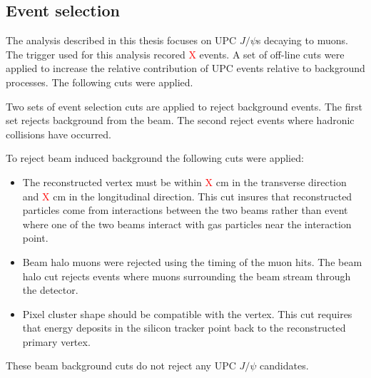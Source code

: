     \subsection{Event selection}
      The analysis described in this thesis focuses on UPC $J/\psi$s decaying to 
        muons. 
      The trigger used for this analysis recored \textcolor{red}{X} events.
      A set of off-line cuts were applied to increase the relative contribution 
        of UPC events relative to background processes. 
      The following cuts were applied. 
  
      Two sets of event selection cuts are applied to reject background events. 
      The first set rejects background from the beam.
      The second reject events where hadronic collisions have occurred.
      
      To reject beam induced background the following cuts were applied:
      \begin{itemize}
        \item The reconstructed vertex must be within \textcolor{red}{X} cm in 
          the transverse direction and \textcolor{red}{X} cm in the 
          longitudinal direction. This cut insures that reconstructed particles 
          come from interactions between the two beams rather than event where 
          one of the two beams interact with gas particles near the interaction 
          point. 
  	    \item Beam halo muons were rejected using the timing of the muon hits.
              The beam halo cut rejects events where muons surrounding the beam 
              stream through the detector. 
  	    \item Pixel cluster shape should be compatible with the vertex. 
          This cut requires that energy deposits in the silicon tracker point 
            back to the reconstructed  primary vertex. 
      \end{itemize}
      These beam background cuts do not reject any UPC $J/\psi$ candidates. 
  
